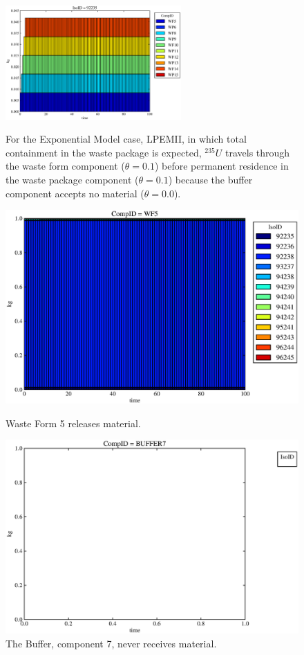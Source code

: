 \begin{figure}[ht]
\centering
\includegraphics[width=0.6\textwidth]{./chapters/demonstration/base/lpEMII.eps}
\caption[$^{235}U$ residence. Lumped Parameter  Waste Package No Release.]{
For the Exponential Model case, LPEMII, in which total containment in the waste 
package is expected, $^{235}U$ travels through the waste form component ($\theta 
= 0.1$) before permanent residence in the waste package component ($\theta = 
0.1$) because the buffer component accepts no material ($\theta = 0.0$).  }
\label{fig:lpBegin}
\begin{minipage}[b]{0.45\linewidth}

  \includegraphics[width=\textwidth]{./chapters/demonstration/base/lpEMII1.eps}
  \caption[Case LPEMII Waste Form Contaminants.]{
    Waste Form 5 releases material. 
    }
  \label{fig:lpEMIIwf5}
  
  \includegraphics[width=\textwidth]{./chapters/demonstration/base/lpEMII3.eps}
  \caption[Case LPEMII Buffer Contaminants]{
    The Buffer, component 7, never receives material.
    }
  \label{fig:lpEMIIbuff}


\end{minipage}
\end{figure}
